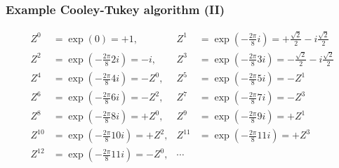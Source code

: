 \documentclass[hyperref={colorlinks=true}]{beamer}
\begin{document}
\begin{frame}%
  \frametitle{Example Cooley-Tukey algorithm (II)}
  
  \begin{align}
    Z^0    &= \exp(0)                   = +1,   &Z^1    &= \exp(-\frac{2\pi}{8}i)    = +\frac{\sqrt{2}}{2} - i\frac{\sqrt{2}}{2} \nonumber \\
    Z^2    &= \exp(-\frac{2\pi}{8} 2i)  = -i,   &Z^3    &= \exp(-\frac{2\pi}{8}3i)   = -\frac{\sqrt{2}}{2} - i\frac{\sqrt{2}}{2} \nonumber \\
    Z^4    &= \exp(-\frac{2\pi}{8} 4i)  = -Z^0, &Z^5    &= \exp(-\frac{2\pi}{8} 5i)  = -Z^1 \nonumber \\
    Z^6    &= \exp(-\frac{2\pi}{8} 6i)  = -Z^2, &Z^7    &= \exp(-\frac{2\pi}{8} 7i)  = -Z^3 \nonumber \\
    Z^8    &= \exp(-\frac{2\pi}{8} 8i)  = +Z^0, &Z^9    &= \exp(-\frac{2\pi}{8} 9i)  = +Z^1 \nonumber \\
    Z^{10} &= \exp(-\frac{2\pi}{8} 10i) = +Z^2, &Z^{11} &= \exp(-\frac{2\pi}{8} 11i) = +Z^3 \nonumber \\
    Z^{12} &= \exp(-\frac{2\pi}{8} 11i) = -Z^0, &\cdots  \nonumber
  \end{align}
  
\end{frame}  

\end{document}
